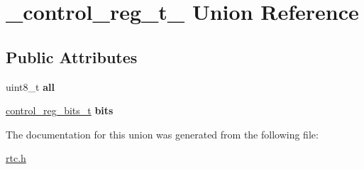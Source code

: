 \hypertarget{union__control__reg__t__}{}\section{\+\_\+control\+\_\+reg\+\_\+t\+\_\+ Union Reference}
\label{union__control__reg__t__}
\subsection*{Public Attributes}
\begin{DoxyCompactItemize}
\item 
\mbox{\label{union__control__reg__t___a35ffce9d7fc7017dd3ff7c5226ee4fc8}} 
uint8\+\_\+t {\bfseries all}
\item 
\mbox{\label{union__control__reg__t___a386b23391b9c1a0a680f90fd14d2e567}} 
\hyperlink{struct__control__reg__bits__t__}{control\+\_\+reg\+\_\+bits\+\_\+t} {\bfseries bits}
\end{DoxyCompactItemize}


The documentation for this union was generated from the following file\+:\begin{DoxyCompactItemize}
\item 
\hyperlink{rtc_8h}{rtc.\+h}\end{DoxyCompactItemize}

